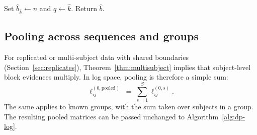 \begin{algorithm}[H]
\caption{MAPBacktrack$(h^\star,\widehat{k})$}
\label{alg:map-backtrack}
\BlankLine
Set $\widehat{b}_{\widehat{k}}\leftarrow n$ and $q\leftarrow\widehat{k}$.
Return $\widehat{b}$.
\end{algorithm}

\subsection{Pooling across sequences and groups}
\label{sec:alg-pooling}

For replicated or multi-subject data with shared boundaries (Section~\ref{sec:replicates}),
Theorem~\ref{thm:multisubject} implies that subject-level block evidences multiply.
In log space, pooling is therefore a simple sum:
\begin{equation}
    \ell^{(0,\text{pooled})}_{ij} \;=\; \sum_{s=1}^S \ell^{(0,s)}_{ij}.
\end{equation}
The same applies to known groups, with the sum taken over subjects in a group.
The resulting pooled matrices can be passed unchanged to Algorithm~\ref{alg:dp-log}.


